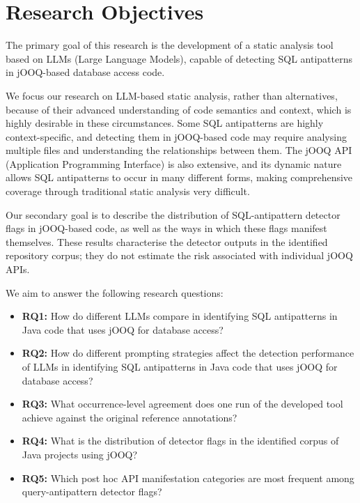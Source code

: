\section{Research Objectives}\label{sec:objectives}

The primary goal of this research is the development of a static analysis tool based on LLMs (Large Language Models), capable of detecting SQL antipatterns in jOOQ-based database access code.

We focus our research on LLM-based static analysis, rather than alternatives, because of their advanced understanding of code semantics and context, which is highly desirable in these circumstances. Some SQL antipatterns are highly context-specific, and detecting them in jOOQ-based code may require analysing multiple files and understanding the relationships between them. The jOOQ API (Application Programming Interface) is also extensive, and its dynamic nature allows SQL antipatterns to occur in many different forms, making comprehensive coverage through traditional static analysis very difficult.

Our secondary goal is to describe the distribution of SQL-antipattern detector flags in jOOQ-based code, as well as the ways in which these flags manifest themselves. These results characterise the detector outputs in the identified repository corpus; they do not estimate the risk associated with individual jOOQ APIs.

We aim to answer the following research questions:

\begin{itemize}
    \item \textbf{RQ1:} How do different LLMs compare in identifying SQL antipatterns in Java code that uses jOOQ for database access?
    \item \textbf{RQ2:} How do different prompting strategies affect the detection performance of LLMs in identifying SQL antipatterns in Java code that uses jOOQ for database access?
    \item \textbf{RQ3:} What occurrence-level agreement does one run of the developed tool achieve against the original reference annotations?
    \item \textbf{RQ4:} What is the distribution of detector flags in the identified corpus of Java projects using jOOQ?
    \item \textbf{RQ5:} Which post hoc API manifestation categories are most frequent among query-antipattern detector flags?
\end{itemize}

